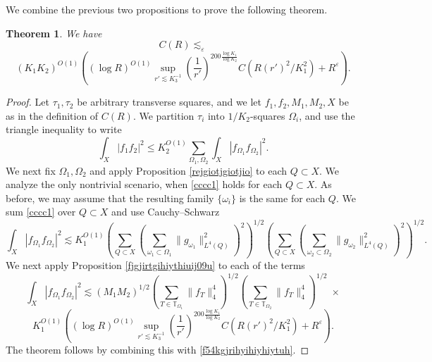 \documentclass{amsart}%
\numberwithin{equation}{section}
\newtheorem{theorem}{Theorem}[section]
\newcommand{\e}{\varepsilon}
\newcommand{\ZT}{\mathbb{T}}
\newcommand{\1}{\mathbbm{1}}
\begin{document}
\smallskip

We combine the previous two propositions to prove the following theorem.
\begin{theorem}
\label{jregiurtiguiuhyuh8}	
We have$$C(R)\lesssim_\e$$
\begin{equation}
\label{fiojugurtuhgiyt9hi0967i}	
 (K_1K_2)^{O(1)}\left((\log R)^{O(1)}\sup_{r'\lesssim K_3^{-1}}(\frac{1}{r'})^{200\frac{\log{K_1}}{\log K_2}}C(R(r')^2/K_1^2)+R^\e\right).
\end{equation}
\end{theorem}
\begin{proof}
Let $\tau_1,\tau_2$ be arbitrary transverse squares, and we let $f_1,f_2,M_1,M_2,X$ be as in the definition of $C(R)$. We partition $\tau_i$ into $1/K_2$-squares $\Omega_i$, and use the triangle inequality to write
\begin{equation}
\label{f54kgjrihyihiyhiytuh}
\int_{X}|f_1f_2|^2\le K_2^{O(1)}\sum_{\Omega_1,\Omega_2}\int_X|f_{\Omega_1}f_{\Omega_2}|^2.\end{equation}
We next fix $\Omega_1,\Omega_2$ and apply Proposition \ref{rejgiotjgiotjio} to each $Q\subset X$. We analyze the only nontrivial scenario, when \eqref{cccc1} holds for each $Q\subset X$. As before, we may assume that the resulting family $\{\omega_i\}$ is the same for each $Q$. We sum \eqref{cccc1} over $Q\subset X$
and use Cauchy--Schwarz
$$\int_{X}|f_{\Omega_1}f_{\Omega_2}|^2\lesssim K_1^{O(1)}(\sum_{Q\subset X}(\sum_{\omega_1\subset \Omega_1}\|g_{\omega_1}\|_{L^4(Q)}^2)^2)^{1/2}(\sum_{Q\subset X}(\sum_{\omega_2\subset \Omega_2}\|g_{\omega_2}\|_{L^4(Q)}^2)^2)^{1/2}.$$
We next apply Proposition \ref{fjgjirtgihiythiuij09u} to each of the terms
$$\int_{X}|f_{\Omega_1}f_{\Omega_2}|^2\lesssim (M_1M_2)^{1/2}(\sum_{T\in\ZT_{\Omega_1}}\big\|f_{T}\big\|_4^4)^{1/2}(\sum_{T\in\ZT_{\Omega_2}}\big\|f_{T}\big\|_4^4)^{1/2}\;\times$$
$$K_1^{O(1)}\left((\log R)^{O(1)}\sup_{r'\lesssim K_3^{-1}}(\frac{1}{r'})^{200\frac{\log{K_1}}{\log K_2}}C(R(r')^2/K_1^2)+R^\e\right).$$
The theorem follows by combining this with \eqref{f54kgjrihyihiyhiytuh}. \qedhere

\end{proof}
\end{document}
